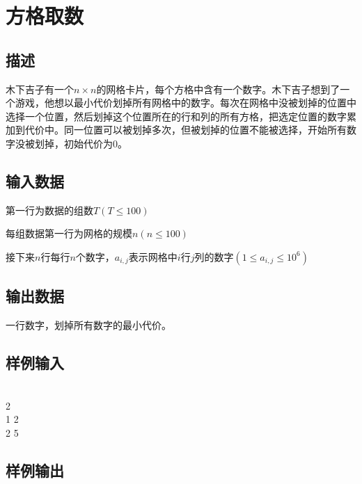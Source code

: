 \ifx\allfiles\undefined

\fi


\section{方格取数}
\subsection*{描述}
木下吉子有一个$n\times n$的网格卡片，每个方格中含有一个数字。木下吉子想到了一个游戏，他想以最小代价划掉所有网格中的数字。每次在网格中没被划掉的位置中选择一个位置，然后划掉这个位置所在的行和列的所有方格，把选定位置的数字累加到代价中。同一位置可以被划掉多次，但被划掉的位置不能被选择，开始所有数字没被划掉，初始代价为0。

\subsection*{输入数据}
第一行为数据的组数$T(T\leqslant 100)$

每组数据第一行为网格的规模$n(n\leqslant 100)$

接下来$n$行每行$n$个数字，$a_{i,j}$表示网格中$i$行$j$列的数字$(1\leqslant a_{i,j}\leqslant 10^6)$

\subsection*{输出数据}
一行数字，划掉所有数字的最小代价。

\subsection*{样例输入}
\\
2\\
1 2\\
2 5

\subsection*{样例输出}


\ifx\allfiles\undefined

\fi